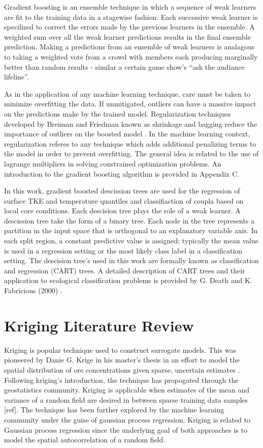 Gradient boosting is an ensemble technique in which a sequence of weak learners are fit to the training data in a stagewise fashion.  Each successive weak learner is specilized to correct the errors made by the previous learners in the ensemble.  A weighted sum over all the weak learner predictions results in the final ensemble prediction.  Making a predictions from an ensemble of weak learners is analagous to taking a weighted vote from a crowd with members each producing marginally better than random results - similar a certain game show's ``ask the audiance lifeline''.  

As in the application of any machine learning technique, care must be taken to minimize overfitting the data.  If unmitigated, outliers can have a massive impact on the predictions make by the trained model.  Regularization techniques developed by Breiman and Friedman known as shrinkage and bagging reduce the importance of outliers on the boosted model \cite{breiman1996}.  In the machine learning context, regularization referes to any technique which adds additional penalizing terms to the model in order to prevent overfitting.  The general idea is related to the use of lagrange multipliers in solving constrained optimization problems.  An introduction to the gradient boosting algorithm is provided in Appendix C.

In this work, gradient boosted descission trees are used for the regression of surface TKE and temperature quantiles and classifiaction of coupla based on local core conditions.   Each descision tree plays the role of a weak learner.  A descission tree take the form of a binary tree.  Each node in the tree represents a partition in the input space that is orthogonal to an explanatory variable axis.  In each split region, a constant predictive value is assigned; typically the mean value is used in a regression setting or the most likely class label in a classification setting.  The descision tree's used in this work are formally known as classification and regression (CART) trees.  A detailed description of CART trees and their application to ecological classification problems is provided by G. Death and K. Fabricious (2000) \cite{death2000}. 

\section{Kriging Literature Review}

Kriging is popular technique used to construct surrogate models.
This was pioneered by Danie G. Krige in his master's thesis in an effort to model the spatial distribution of ore concentrations given sparse, uncertain estimates \cite{krige51}. Following kriging's introduction, the technique has propogated through the geostatistics community.  Kriging is applicable when estimates of the mean and variance of a random field are desired in between sparse training data samples [ref].  The technique has been further explored by the machine learning community under the guise of gaussian process regression.  Kriging is related to Gaussian process regression since the underlying goal of both approaches is to model the spatial autocorrelation of a random field.  

